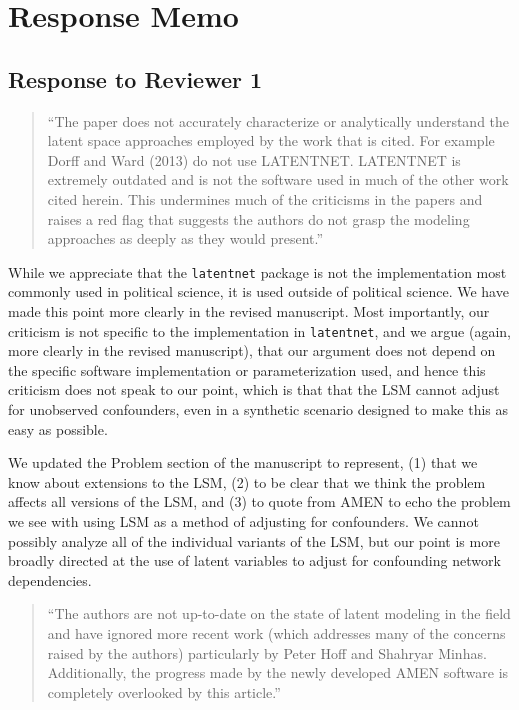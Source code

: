 
\section{Response Memo}\label{response-memo}

\subsection{Response to Reviewer 1}\label{response-to-reviewer-1}

\begin{quote}
``The paper does not accurately characterize or analytically understand
the latent space approaches employed by the work that is cited. For
example Dorff and Ward (2013) do not use LATENTNET. LATENTNET is
extremely outdated and is not the software used in much of the other
work cited herein. This undermines much of the criticisms in the papers
and raises a red flag that suggests the authors do not grasp the
modeling approaches as deeply as they would present.''
\end{quote}

While we appreciate that the \texttt{latentnet} package is not the
implementation most commonly used in political science, it is used
outside of political science. We have made this point more clearly in
the revised manuscript. Most importantly, our criticism is not specific
to the implementation in \texttt{latentnet}, and we argue (again, more
clearly in the revised manuscript), that our argument does not depend on
the specific software implementation or parameterization used, and hence
this criticism does not speak to our point, which is that that the LSM
cannot adjust for unobserved confounders, even in a synthetic scenario
designed to make this as easy as possible.

We updated the Problem section of the manuscript to represent, (1) that we know about extensions to the LSM, (2) to be clear that we think the problem affects all versions of the LSM, and (3) to quote from AMEN to echo the problem we see with using LSM as a method of adjusting for confounders. We cannot possibly analyze all of the individual variants of the LSM, but our point is more broadly directed at the use of latent variables to adjust for confounding network dependencies. 

\begin{quote}
``The authors are not up-to-date on the state of latent modeling in the
field and have ignored more recent work (which addresses many of the
concerns raised by the authors) particularly by Peter Hoff and Shahryar
Minhas. Additionally, the progress made by the newly developed AMEN
software is completely overlooked by this article.''
\end{quote}

